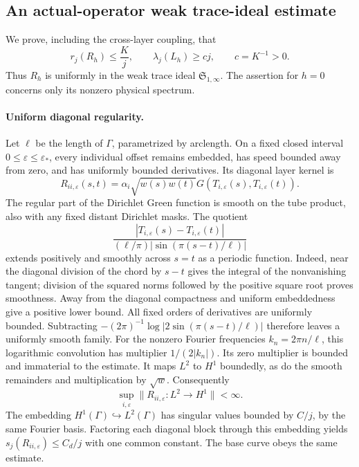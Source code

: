 \documentclass[aps,pra,reprint,superscriptaddress,longbibliography]{revtex4-2}
\begin{document}
\subsection{An actual-operator weak trace-ideal estimate}
\label{sgt:prep:weakS1}

We prove, including the cross-layer coupling, that
\begin{equation}
 r_j(R_h)\le \frac{K}{j},\qquad
 \lambda_j(L_h)\ge c j,\qquad c=K^{-1}>0.
 \label{sgt:prep:spectral-bound}
\end{equation}
Thus $R_h$ is uniformly in the weak trace ideal $\mathfrak S_{1,\infty}$.
The assertion for $h=0$ concerns only its nonzero physical spectrum.

\paragraph{Uniform diagonal regularity.}
Let $\ell$ be the length of $\Gamma$, parametrized by arclength.
On a fixed closed interval $0\le\varepsilon\le\varepsilon_*$, every
individual offset remains embedded, has speed bounded away from zero,
and has uniformly bounded derivatives. Its diagonal layer kernel is
\[
 R_{ii,\varepsilon}(s,t)=\alpha_i\sqrt{w(s)w(t)}
 G(T_{i,\varepsilon}(s),T_{i,\varepsilon}(t)).
\]
The regular part of the Dirichlet Green function is smooth on the tube
product, also with any fixed distant Dirichlet masks. The quotient
\[
 \frac{|T_{i,\varepsilon}(s)-T_{i,\varepsilon}(t)|}
 {(\ell/\pi)|\sin(\pi(s-t)/\ell)|}
\]
extends positively and smoothly across $s=t$ as a periodic function.
Indeed, near the diagonal division of the chord by $s-t$ gives the
integral of the nonvanishing tangent; division of the squared norms
followed by the positive square root proves smoothness. Away from the
diagonal compactness and uniform embeddedness give a positive lower
bound. All fixed orders of derivatives are uniformly bounded.
Subtracting $-(2\pi)^{-1}\log|2\sin(\pi(s-t)/\ell)|$ therefore leaves
a uniformly smooth family. For the nonzero Fourier frequencies
$k_n=2\pi n/\ell$, this logarithmic convolution has multiplier
$1/(2|k_n|)$. Its zero multiplier is bounded and immaterial to the
estimate. It maps $L^2$ to $H^1$ boundedly, as do the smooth remainders
and multiplication by $\sqrt w$. Consequently
\[
 \sup_{i,\varepsilon}\|R_{ii,\varepsilon}:L^2\longrightarrow H^1\|<\infty.
\]
The embedding $H^1(\Gamma)\hookrightarrow L^2(\Gamma)$ has singular
values bounded by $C/j$, by the same Fourier basis. Factoring each
diagonal block through this embedding yields
$s_j(R_{ii,\varepsilon})\le C_d/j$ with one common constant.
The base curve obeys the same estimate.
\end{document}
